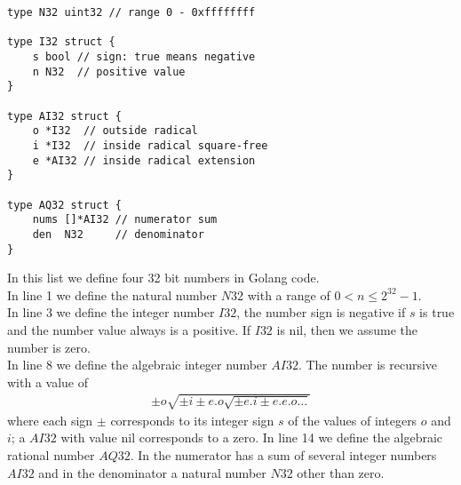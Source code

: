 \documentclass{article}
\begin{document}
\setlength{\columnsep}{30pt}
\begin{multicols}{2}
\begin{lstlisting}
type N32 uint32 // range 0 - 0xffffffff

type I32 struct {
	s bool // sign: true means negative
	n N32  // positive value
}

type AI32 struct {
	o *I32  // outside radical
	i *I32  // inside radical square-free
	e *AI32 // inside radical extension
}

type AQ32 struct {
	nums []*AI32 // numerator sum
	den  N32     // denominator
}
\end{lstlisting}
In this list we define four 32 bit numbers in Golang code.\\
In line 1 we define the natural number $N32$ with a range of $0 < n \leq 2^{32} - 1$.\\
In line 3 we define the integer number $I32$, the number sign is negative if $s$ is true 
and the number value always is a positive. If $I32$ is nil, then we assume the number
is zero.\\
In line 8 we define the algebraic integer number $AI32$. The number is recursive with a value of
\begin{align}
\pm o\sqrt{\pm i \pm e.o\sqrt{\pm e.i \pm e.e.o ... }}
\end{align}
where each sign $\pm$ corresponds to its integer sign $s$ of the values of integers $o$ and $i$;
a $AI32$ with value nil corresponds to a zero.
In line 14 we define the algebraic rational number $AQ32$. In the numerator has a sum of several
integer numbers $AI32$ and in the denominator a natural number $N32$ other than zero.
\end{multicols}
\end{document}
